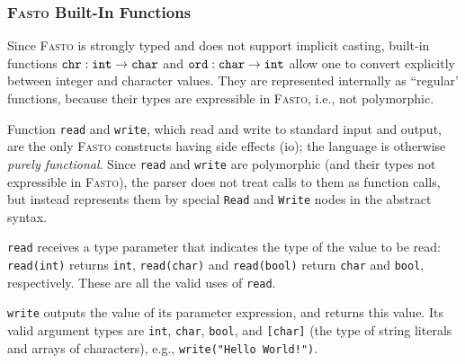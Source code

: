 \documentclass[a4paper,11pt]{article}
\newcommand{\fasto}{\textsc{Fasto}\xspace}
\begin{document}
 
\subsubsection{\fasto Built-In Functions}
\label{subsec:built-ins}

Since \fasto is strongly typed and does not support implicit casting, built-in
functions ${\tt{}chr} : {\tt{}int} \rightarrow {\tt{}char}$ and 
${\tt{}ord} : {\tt{}char} \rightarrow {\tt{}int}$ 
allow one to convert explicitly between integer and character values. 
They are represented internally as ``regular' functions, because their
types are expressible in \fasto, i.e., not polymorphic.

Function {\tt read} and {\tt write}, which read and write to standard input
and output, are the only \fasto constructs having side effects ({\sc io}); 
the language is otherwise {\em purely functional}.
Since {\tt read} and {\tt write} are polymorphic (and their types not expressible in \fasto),
the parser does not treat calls to them as function calls,
but instead represents them by special {\tt Read} and 
{\tt Write} nodes in the abstract syntax.

{\tt read} receives a type parameter that indicates the type of the value to be read:
{\tt read(int)} returns \texttt{int}, {\tt read(char)} and {\tt read(bool)} return 
\texttt{char} and \texttt{bool}, respectively. These are all the valid uses of {\tt read}.

{\tt write} outputs the value of its parameter expression, and returns this value.
Its valid argument types are {\tt int}, {\tt char}, {\tt bool}, and {\tt [char]} 
(the type of string literals and arrays of characters), 
e.g., {\tt write("Hello World!")}. 



%
\end{document}
